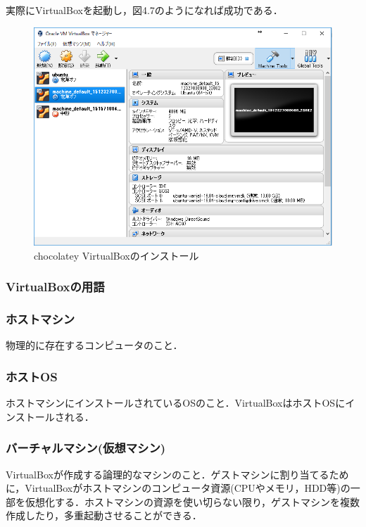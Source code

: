 実際にVirtualBoxを起動し，図4.7のようになれば成功である．
\begin{figure}[htb]
\centering
\includegraphics[width=13cm]{4-7.png}
\caption{chocolatey VirtualBoxのインストール}\label{4-7}
\end{figure}
\newpage

\subsubsection{VirtualBoxの用語}

\subsubsection{ホストマシン}

物理的に存在するコンピュータのこと．

\subsubsection{ホストOS}

ホストマシンにインストールされているOSのこと．VirtualBoxはホストOSにインストールされる．

\subsubsection{バーチャルマシン(仮想マシン)}

VirtualBoxが作成する論理的なマシンのこと．ゲストマシンに割り当てるために，VirtualBoxがホストマシンのコンピュータ資源(CPUやメモリ，HDD等)の一部を仮想化する．ホストマシンの資源を使い切らない限り，ゲストマシンを複数作成したり，多重起動させることができる．

